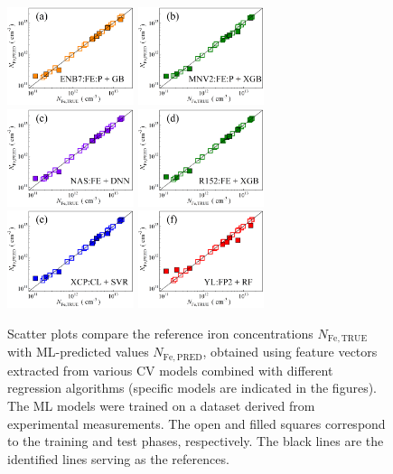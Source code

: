 \documentclass[10pt]{iopart}
\begin{document}
\begin{figure}
\includegraphics[width=0.33\textwidth]{Fig8a}
\includegraphics[width=0.33\textwidth]{Fig8b}
\includegraphics[width=0.33\textwidth]{Fig8c}
\includegraphics[width=0.33\textwidth]{Fig8d}
\includegraphics[width=0.33\textwidth]{Fig8e}
\includegraphics[width=0.33\textwidth]{Fig8f}
\caption{
Scatter plots compare the reference iron concentrations $N_\mathrm{Fe,TRUE}$ with ML-predicted values $N_\mathrm{Fe,PRED}$,
obtained using feature vectors extracted from various CV models combined with different regression algorithms
(specific models are indicated in the figures).
The ML models were trained on a dataset derived from experimental measurements.
The open and filled squares correspond to the training and test phases, respectively.
The black lines are the identified lines serving as the references.
}\label{Fig8}
\end{figure}
\end{document}
